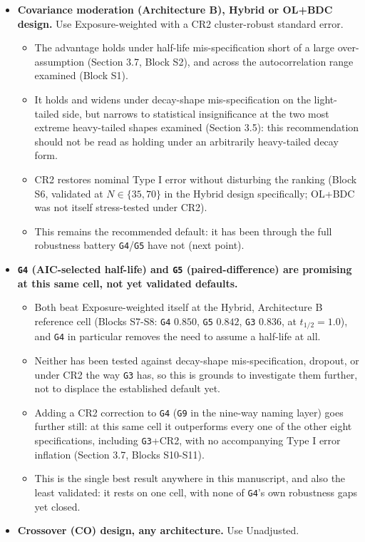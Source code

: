 \documentclass[
  11pt,
]{article}
\newcounter{none} %
\providecommand{\tightlist}{%
  \setlength{\itemsep}{0pt}\setlength{\parskip}{0pt}}
\begin{document}
\begin{itemize}
\tightlist
\item
  \textbf{Covariance moderation (Architecture B), Hybrid or OL+BDC
  design.} Use Exposure-weighted with a CR2 cluster-robust standard
  error.

  \begin{itemize}
  \tightlist
  \item
    The advantage holds under half-life mis-specification short of a
    large over-assumption (Section 3.7, Block S2), and across the
    autocorrelation range examined (Block S1).
  \item
    It holds and widens under decay-shape mis-specification on the
    light-tailed side, but narrows to statistical insignificance at
    the two most extreme heavy-tailed shapes examined (Section 3.5):
    this recommendation should not be read as holding under an
    arbitrarily heavy-tailed decay form.
  \item
    CR2 restores nominal Type I error without disturbing the ranking
    (Block S6, validated at \(N \in \{35, 70\}\) in the Hybrid design
    specifically; OL+BDC was not itself stress-tested under CR2).
  \item
    This remains the recommended default: it has been through the
    full robustness battery \texttt{G4}/\texttt{G5} have not (next point).
  \end{itemize}
\item
  \textbf{\texttt{G4} (AIC-selected half-life) and \texttt{G5} (paired-difference) are
  promising at this same cell, not yet validated defaults.}

  \begin{itemize}
  \tightlist
  \item
    Both beat Exposure-weighted itself at the Hybrid, Architecture B
    reference cell (Blocks S7-S8: \texttt{G4} \(0.850\), \texttt{G5} \(0.842\), \texttt{G3}
    \(0.836\), at \(t_{1/2}=1.0\)), and \texttt{G4} in particular removes the
    need to assume a half-life at all.
  \item
    Neither has been tested against decay-shape mis-specification,
    dropout, or under CR2 the way \texttt{G3} has, so this is grounds to
    investigate them further, not to displace the established
    default yet.
  \item
    Adding a CR2 correction to \texttt{G4} (\texttt{G9} in the nine-way naming
    layer) goes further still: at this same cell it outperforms every
    one of the other eight specifications, including \texttt{G3}+CR2, with
    no accompanying Type I error inflation (Section 3.7, Blocks
    S10-S11).
  \item
    This is the single best result anywhere in this manuscript, and
    also the least validated: it rests on one cell, with none of
    \texttt{G4}'s own robustness gaps yet closed.
  \end{itemize}
\item
  \textbf{Crossover (CO) design, any architecture.} Use Unadjusted.


\end{itemize}
\end{document}
